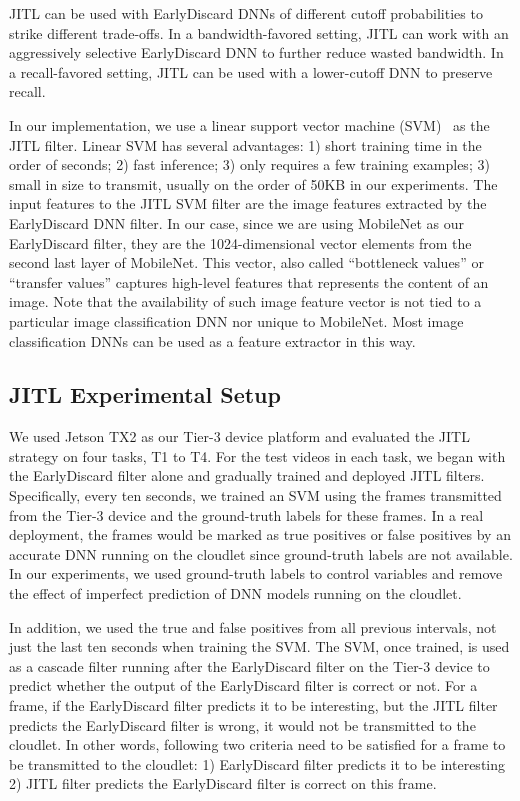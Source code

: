 JITL can be used with EarlyDiscard DNNs of different cutoff probabilities to
strike different trade-offs. In a bandwidth-favored setting, JITL can work with
an aggressively selective EarlyDiscard DNN to further reduce wasted bandwidth. In
a recall-favored setting, JITL can be used with a lower-cutoff DNN to preserve
recall.

In our implementation, we use a linear support vector machine
(SVM)~\cite{Friedman2001} as the JITL filter. Linear SVM has several advantages:
1) short training time in the order of seconds; 2) fast inference; 3) only
requires a few training examples; 3) small in size to transmit, usually on the
order of 50KB in our experiments. The input features to the JITL SVM filter are
the image features extracted by the EarlyDiscard DNN filter. In our case, since
we are using MobileNet as our EarlyDiscard filter, they are the 1024-dimensional
vector elements from the second last layer of MobileNet. This vector, also
called ``bottleneck values'' or ``transfer values'' captures high-level features
that represents the content of an image. Note that the availability of such
image feature vector is not tied to a particular image classification DNN nor
unique to MobileNet. Most image classification DNNs can be used as a feature
extractor in this way.

\subsection{JITL Experimental Setup}

We used Jetson TX2 as our Tier-3 device platform and evaluated the JITL strategy
on four tasks, T1 to T4. For the test videos in each task, we began with the
EarlyDiscard filter alone and gradually trained and deployed JITL filters.
Specifically, every ten seconds, we trained an SVM using the frames transmitted
from the Tier-3 device and the ground-truth labels for these frames. In a real
deployment, the frames would be marked as true positives or false positives by
an accurate DNN running on the cloudlet since ground-truth labels are not
available. In our experiments, we used ground-truth labels to control variables
and remove the effect of imperfect prediction of DNN models running on the
cloudlet.

In addition, we used the true and false positives from all previous intervals,
not just the last ten seconds when training the SVM. The SVM, once trained, is
used as a cascade filter running after the EarlyDiscard filter on the Tier-3
device to predict whether the output of the EarlyDiscard filter is correct or
not. For a frame, if the EarlyDiscard filter predicts it to be interesting, but
the JITL filter predicts the EarlyDiscard filter is wrong, it would not be
transmitted to the cloudlet. In other words, following two criteria need to be
satisfied for a frame to be transmitted to the cloudlet: 1) EarlyDiscard filter
predicts it to be interesting 2) JITL filter predicts the EarlyDiscard filter is
correct on this frame.

